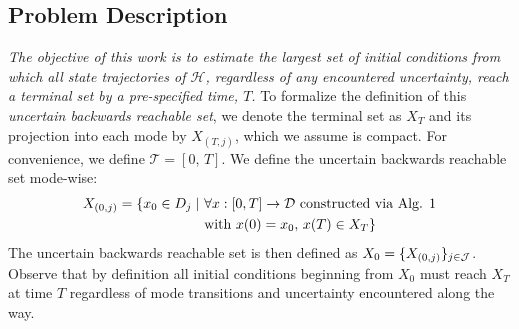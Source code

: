\subsection{Problem Description}
{\em The objective of this work is to estimate the largest set of initial conditions from which all state trajectories of $\mathcal H$, regardless of any encountered uncertainty, reach a terminal set by a pre-specified time, $T$.}
To formalize the definition of this \emph{uncertain backwards reachable set}, we denote the terminal set as $X_T$ and its projection into each mode by $X_{(T,j)}$, which we assume is compact.
For convenience, we define $\mathcal T=[0,\,T]$.
We define the uncertain backwards reachable set mode-wise:
\begin{align}
\begin{aligned}
     X_{(0,j)}=\{x_0\in D_j \mid\ &\forall x: [0,T] \to {\cal D} \text{ constructed via Alg. 1} \\\ & \text{with } x(0) = x_0, \, x(T) \in X_T \}
     \label{eq:brs}
\end{aligned}
\end{align}
The uncertain backwards reachable set is then defined as $X_0 = \{X_{(0,j)} \}_{j\in {\cal J}}$.
Observe that by definition all initial conditions beginning from $X_0$ must reach $X_T$ at time $T$ regardless of mode transitions and uncertainty encountered along the way.

